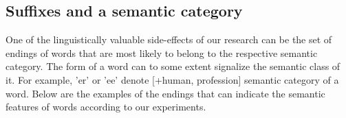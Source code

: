 \documentclass[letterpaper]{article}
\begin{document}
\subsection{Suffixes and a semantic category}
One of the linguistically valuable side-effects of our research can be 
the set of endings of words that are most likely to belong to the
respective semantic category.
The form of a word can to some extent signalize the semantic class of it. 
For example, 'er' or 'ee' denote [+human, profession] semantic category of a word.
Below are the examples of the endings that
can indicate the semantic features of words according to our experiments.


\end{document}
